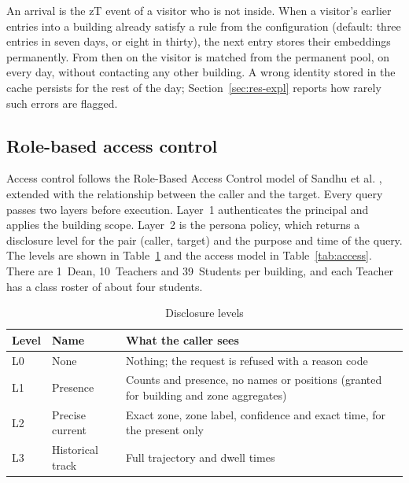 \documentclass[12pt,a4paper,oneside]{report}
\begin{document}
An arrival is the zT event of a visitor who is not inside. When a visitor's earlier entries into a building already satisfy a rule from the configuration (default: three entries in seven days, or eight in thirty), the next entry stores their embeddings permanently. From then on the visitor is matched from the permanent pool, on every day, without contacting any other building. A wrong identity stored in the cache persists for the rest of the day; Section~\ref{sec:res-expl} reports how rarely such errors are flagged.

\subsection{Role-based access control}
Access control follows the Role-Based Access Control model of Sandhu et al. \cite{ref21}, extended with the relationship between the caller and the target. Every query passes two layers before execution. Layer~1 authenticates the principal and applies the building scope. Layer~2 is the persona policy, which returns a disclosure level for the pair (caller, target) and the purpose and time of the query. The levels are shown in Table~\ref{tab:levels} and the access model in Table~\ref{tab:access}. There are 1~Dean, 10~Teachers and 39~Students per building, and each Teacher has a class roster of about four students.

\begin{table}[htbp]
\centering
\caption{Disclosure levels}\label{tab:levels}
{\small\setlength{\tabcolsep}{4pt}\renewcommand{\arraystretch}{1.2}
\begin{tabular}{|p{1.17cm}|p{4.11cm}|p{9.00cm}|}\hline
\textbf{Level} & \textbf{Name} & \textbf{What the caller sees}\\\hline
L0 & None & Nothing; the request is refused with a reason code\\\hline
L1 & Presence & Counts and presence, no names or positions (granted for building and zone aggregates)\\\hline
L2 & Precise current & Exact zone, zone label, confidence and exact time, for the present only\\\hline
L3 & Historical track & Full trajectory and dwell times\\\hline
\end{tabular}}
\end{table}
\end{document}
